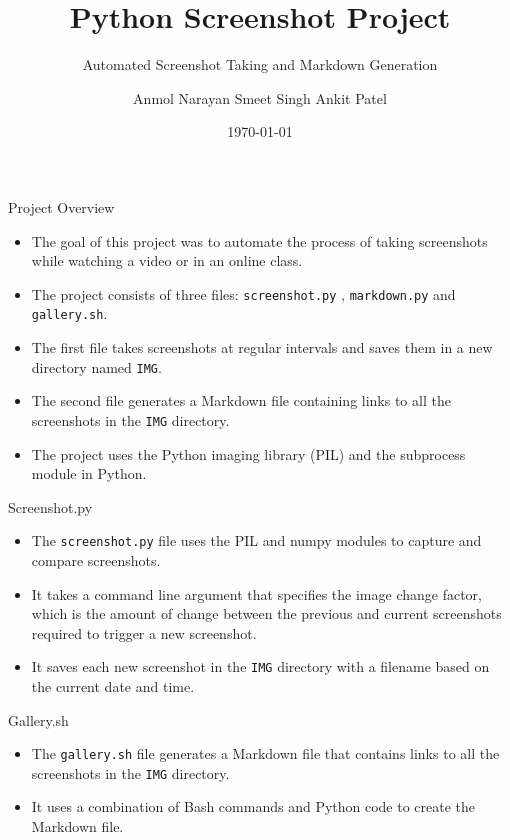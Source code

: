 \documentclass{beamer}
\title{Python Screenshot Project}
\subtitle{Automated Screenshot Taking and Markdown Generation}
\author{Anmol Narayan Smeet Singh Ankit Patel}
\institute{KIIT}
\date{\today}
\begin{document}
\begin{frame}
  \titlepage
\end{frame}

\begin{frame}{Project Overview}
  \begin{itemize}
    \item The goal of this project was to automate the process of taking screenshots while watching a video or in an online class.
    \item The project consists of three files: \texttt{screenshot.py} , \texttt{markdown.py} and \texttt{gallery.sh}.
    \item The first file takes screenshots at regular intervals and saves them in a new directory named \texttt{IMG}.
    \item The second file generates a Markdown file containing links to all the screenshots in the \texttt{IMG} directory.
    \item The project uses the Python imaging library (PIL) and the subprocess module in Python.
  \end{itemize}
\end{frame}

\begin{frame}{Screenshot.py}
  \begin{itemize}
    \item The \texttt{screenshot.py} file uses the PIL and numpy modules to capture and compare screenshots.
    \item It takes a command line argument that specifies the image change factor, which is the amount of change between the previous and current screenshots required to trigger a new screenshot.
    \item It saves each new screenshot in the \texttt{IMG} directory with a filename based on the current date and time.
  \end{itemize}

\end{frame}


\begin{frame}{Gallery.sh}
  \begin{itemize}
    \item The \texttt{gallery.sh} file generates a Markdown file that contains links to all the screenshots in the \texttt{IMG} directory.
    \item It uses a combination of Bash commands and Python code to create the Markdown file.
  \end{itemize}
\end{frame}
\end{document}
